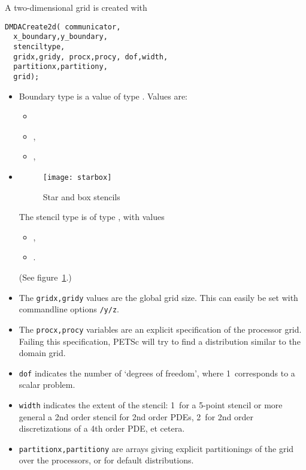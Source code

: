 A two-dimensional grid is created with 
\begin{lstlisting}
DMDACreate2d( communicator,
  x_boundary,y_boundary,
  stenciltype,
  gridx,gridy, procx,procy, dof,width, 
  partitionx,partitiony, 
  grid);
\end{lstlisting}
\begin{itemize}
\item
  Boundary type is a value of type .
  Values are:
  \begin{itemize}
  \item {}
  \item {},
  \item {},
  \end{itemize}
\item
  \begin{figure}[ht]
    \texttt{[image: starbox]}
    \caption{Star and box stencils}
    \label{fig:starbox}
  \end{figure}
  The stencil type is of type ,
  with values
  \begin{itemize}
  \item {},
  \item {}.
  \end{itemize}
  (See figure~\ref{fig:starbox}.)
\item
  The \lstinline{gridx,gridy} values are the global grid size.
  This can easily be set with commandline options
  \lstinline+/y/z+.
\item
  The \lstinline{procx,procy} variables are an explicit specification
  of the processor grid. Failing this specification, PETSc will try to
  find a distribution similar to the domain grid.
\item \lstinline{dof} indicates the number of `degrees of freedom',
  where 1~corresponds to a scalar problem.
\item \lstinline{width} indicates the extent of the stencil:
  1~for a 5-point stencil or more general a 2nd order stencil
  for 2nd order \acp{PDE},
  2~for 2nd order discretizations of a 4th order \ac{PDE}, et cetera.
\item \lstinline{partitionx,partitiony} are arrays
  giving explicit partitionings of the grid over the processors,
  or  for default distributions.
\end{itemize}

